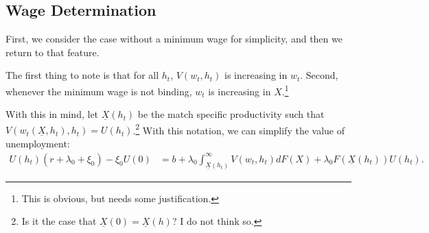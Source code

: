 \documentclass[11pt]{article}
\begin{document}
\subsection[Wage Determination]{Wage Determination}%
\label{sub:wage_determination}

First, we consider the case without a minimum wage for simplicity, and then
we return to that feature.

The first thing to note is that for all $h_t$,  $V(w_t,h_t)$ is increasing
in  $w_t$. Second, whenever the minimum wage is not binding, $w_t$ is
increasing in $X$.\footnote{This is obvious, but needs some justification.}

With this in mind, let $\underline{X}(h_t)$ be the match specific productivity such that
$V(w_t(\underline{X},h_t),h_t) = U(h_t)$.\footnote{Is it the case that
$\underline{X}(0) = \underline{X}(h)$? I do not think so.} With this
notation, we can simplify the value of unemployment:
\begin{align*}
    U(h_t)(r+\lambda_0+\xi_0) - \xi_0 U(0) &= b + \lambda_0
    \int_{\underline{X}(h_t)}^{\infty} V(w_t, h_t) dF(X) +
    \lambda_0F(\underline{X}(h_t)) U(h_t)
.\end{align*}
\end{document}
